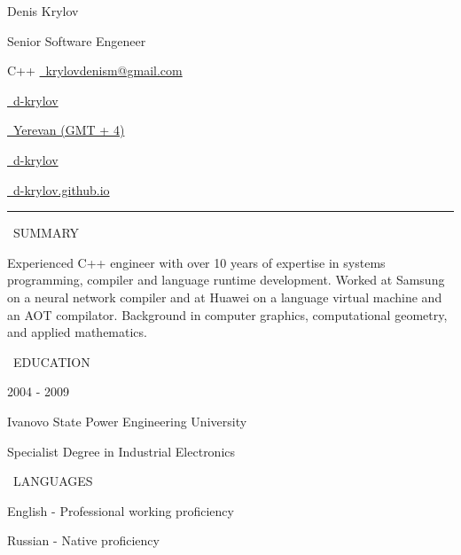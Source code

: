 \documentclass[11pt, a4paper]{cv_template}
\begin{document}

\begin{paracol}{3}

{\Huge Denis Krylov}

{\Large Senior Software Engeneer}

{\large C++}
\switchcolumn
\href{mailto:krylovdenism@gmail.com}{\Large \faAt \  krylovdenism@gmail.com} \par
\href{https://linkedin.com/in/d-krylov/}{\Large \faLinkedin \ d-krylov} \par
\href{https://greenwichmeantime.com/time/armenia/yerevan/}{\Large \faMapMarker \ Yerevan (GMT + 4)}

\switchcolumn

\href{https://github.com/d-krylov/}{\Large \faGithub \ d-krylov} \par
\href{https://d-krylov.github.io/} {\Large \faHome \ d-krylov.github.io}
\end{paracol}

\vspace{10pt}

\hrule

\vspace{10pt}

\begin{paracol}{2}

{\Large \faUser \ SUMMARY}

{\large Experienced C++ engineer with over 10 years of expertise in systems programming, compiler and language runtime development. Worked at Samsung on  a neural network compiler and at Huawei on a language virtual machine and an AOT compilator. Background in computer graphics, computational geometry, and applied mathematics.}

\switchcolumn

{\Large \faUniversity \ EDUCATION}

{\large 2004 - 2009} \par
{\large Ivanovo State Power Engineering University} \par
{\large Specialist Degree in Industrial Electronics}

\vspace{5pt}

{\Large \faLanguage \ LANGUAGES}

{\large English - Professional working proficiency} \par
{\large Russian - Native proficiency}

\end{paracol}
\end{document}
